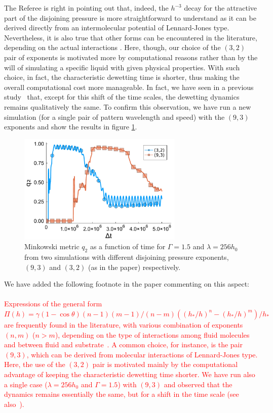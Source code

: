 \documentclass[12pt,english]{article}
\begin{document}
\begin{itemize}
{\item[ \textbf{Answer}]
{
The Referee is right in pointing out that, indeed, the $h^{-3}$ decay 
for the attractive part of the disjoining pressure is more straightforward 
to understand as it can be derived directly from an intermolecular potential of Lennard-Jones type. Nevertheless, it is also true that other forms
can be encountered in the literature, depending on the actual interactions
\cite{SCHWARTZ1998173,Mitlin,Teletzke}. Here, though, our choice of the $(3,2)$ pair of exponents is motivated more by computational reasons rather than by the will of 
simulating a specific liquid with given physical properties.
With such choice, in fact, the characteristic dewetting time 
is shorter, thus making the overall computational cost more manageable.
In fact, we have seen in a previous study~\cite{PhysRevE.104.034801} that,
except for this shift of the time scales, the dewetting dynamics remains 
qualitatively the same. To confirm this observation, we have run 
a new simulation (for a single pair of pattern wavelength and speed) 
with the $(9,3)$ exponents and show the results in figure \ref{fig:rivulets_9_3}.
\begin{figure}
    \centering
    \includegraphics[width=0.7\textwidth]{9-3_3-2_comp_Gamma_1-5.pdf}
    \caption{Minkowski metric $q_2$ as a function of time for 
    $\Gamma = 1.5$ and $\lambda = 256 h_0$ from two simulations with different disjoining 
    pressure exponents, $(9,3)$ and $(3,2)$ (as in the paper) respectively.}
    \label{fig:rivulets_9_3}
\end{figure}
We have added the following footnote in the paper commenting on this aspect:\\
\\
\textcolor{red}{Expressions of 
the general form $\Pi(h) = \gamma(1-\cos \theta)(n-1)(m-1)/(n-m)((h_{\ast}/h)^n - (h_{\ast}/h)^m)/h_{\ast}$
are frequently found in the literature, with various combination of exponents $(n,m)$ ($n>m$), depending
on the type of interactions among fluid molecules and between fluid and substrate~\cite{SCHWARTZ1998173,Mitlin,Teletzke}. A common choice, for instance, is the pair $(9,3)$, which 
can be derived from molecular interactions of Lennard-Jones type. Here, the use of the $(3,2)$ pair is motivated mainly by the computational advantage of keeping the characteristic dewetting time 
shorter. We have run also a single case ($\lambda=256 h_0$ and $\Gamma=1.5$) with $(9,3)$ and observed that 
the dynamics remains essentially the same, but for a shift in the time scale (see also~\cite{PhysRevE.104.034801}).}
}

}
\end{itemize}
\end{document}
